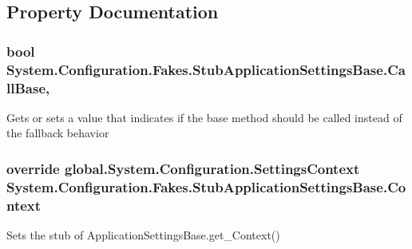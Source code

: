 \subsection{Property Documentation}
\hypertarget{class_system_1_1_configuration_1_1_fakes_1_1_stub_application_settings_base_a63a7070744f36adc490666a68a44f1ba}{
\subsubsection[{Call\-Base}]{\setlength{\rightskip}{0pt plus 5cm}bool System.\-Configuration.\-Fakes.\-Stub\-Application\-Settings\-Base.\-Call\-Base\hspace{0.3cm}{\ttfamily [get]}, {\ttfamily [set]}}}\label{class_system_1_1_configuration_1_1_fakes_1_1_stub_application_settings_base_a63a7070744f36adc490666a68a44f1ba}


Gets or sets a value that indicates if the base method should be called instead of the fallback behavior

\hypertarget{class_system_1_1_configuration_1_1_fakes_1_1_stub_application_settings_base_a2abae2546494246fe2a72efd1334556c}{
\subsubsection[{Context}]{\setlength{\rightskip}{0pt plus 5cm}override global.\-System.\-Configuration.\-Settings\-Context System.\-Configuration.\-Fakes.\-Stub\-Application\-Settings\-Base.\-Context\hspace{0.3cm}{\ttfamily [get]}}}\label{class_system_1_1_configuration_1_1_fakes_1_1_stub_application_settings_base_a2abae2546494246fe2a72efd1334556c}


Sets the stub of Application\-Settings\-Base.\-get\-\_\-\-Context()

